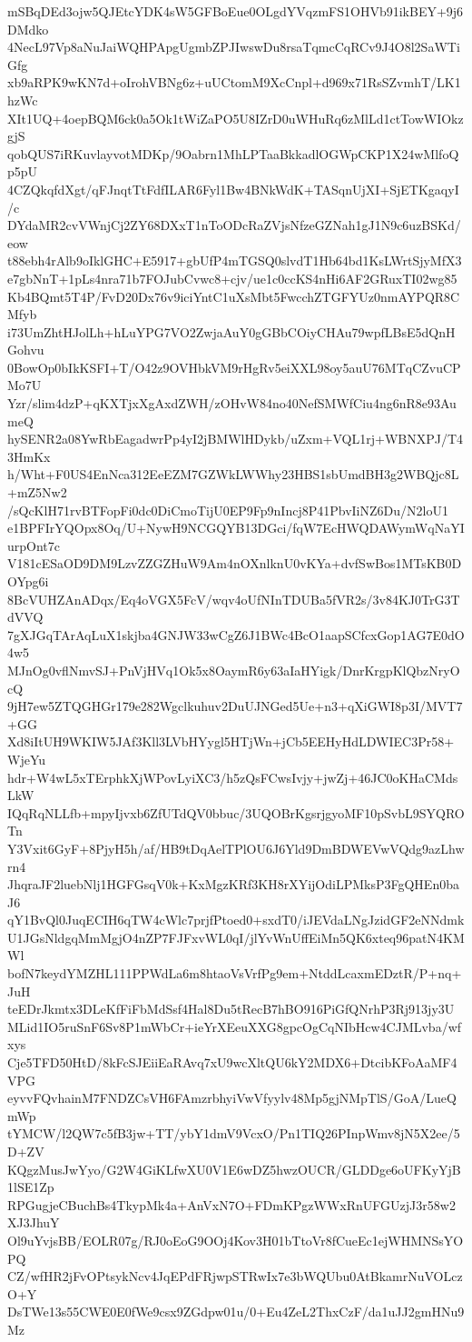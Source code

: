 mSBqDEd3ojw5QJEtcYDK4sW5GFBoEue0OLgdYVqzmFS1OHVb91ikBEY+9j6DMdko
4NecL97Vp8aNuJaiWQHPApgUgmbZPJIwswDu8rsaTqmcCqRCv9J4O8l2SaWTiGfg
xb9aRPK9wKN7d+oIrohVBNg6z+uUCtomM9XcCnpl+d969x71RsSZvmhT/LK1hzWc
XIt1UQ+4oepBQM6ck0a5Ok1tWiZaPO5U8IZrD0uWHuRq6zMlLd1ctTowWIOkzgjS
qobQUS7iRKuvlayvotMDKp/9Oabrn1MhLPTaaBkkadlOGWpCKP1X24wMlfoQp5pU
4CZQkqfdXgt/qFJnqtTtFdfILAR6Fyl1Bw4BNkWdK+TASqnUjXI+SjETKgaqyI/c
DYdaMR2cvVWnjCj2ZY68DXxT1nToODcRaZVjsNfzeGZNah1gJ1N9c6uzBSKd/eow
t88ebh4rAlb9oIklGHC+E5917+gbUfP4mTGSQ0slvdT1Hb64bd1KsLWrtSjyMfX3
e7gbNnT+1pLs4nra71b7FOJubCvwc8+cjv/ue1c0ccKS4nHi6AF2GRuxTI02wg85
Kb4BQmt5T4P/FvD20Dx76v9iciYntC1uXsMbt5FwcchZTGFYUz0nmAYPQR8CMfyb
i73UmZhtHJolLh+hLuYPG7VO2ZwjaAuY0gGBbCOiyCHAu79wpfLBsE5dQnHGohvu
0BowOp0bIkKSFI+T/O42z9OVHbkVM9rHgRv5eiXXL98oy5auU76MTqCZvuCPMo7U
Yzr/slim4dzP+qKXTjxXgAxdZWH/zOHvW84no40NefSMWfCiu4ng6nR8e93AumeQ
hySENR2a08YwRbEagadwrPp4yI2jBMWlHDykb/uZxm+VQL1rj+WBNXPJ/T43HmKx
h/Wht+F0US4EnNca312EeEZM7GZWkLWWhy23HBS1sbUmdBH3g2WBQjc8L+mZ5Nw2
/sQcKlH71rvBTFopFi0dc0DiCmoTijU0EP9Fp9nIncj8P41PbvIiNZ6Du/N2loU1
e1BPFIrYQOpx8Oq/U+NywH9NCGQYB13DGci/fqW7EcHWQDAWymWqNaYIurpOnt7c
V181cESaOD9DM9LzvZZGZHuW9Am4nOXnlknU0vKYa+dvfSwBos1MTsKB0DOYpg6i
8BcVUHZAnADqx/Eq4oVGX5FcV/wqv4oUfNInTDUBa5fVR2s/3v84KJ0TrG3TdVVQ
7gXJGqTArAqLuX1skjba4GNJW33wCgZ6J1BWc4BcO1aapSCfcxGop1AG7E0dO4w5
MJnOg0vflNmvSJ+PnVjHVq1Ok5x8OaymR6y63aIaHYigk/DnrKrgpKlQbzNryOcQ
9jH7ew5ZTQGHGr179e282Wgclkuhuv2DuUJNGed5Ue+n3+qXiGWI8p3I/MVT7+GG
Xd8iItUH9WKIW5JAf3Kll3LVbHYygl5HTjWn+jCb5EEHyHdLDWIEC3Pr58+WjeYu
hdr+W4wL5xTErphkXjWPovLyiXC3/h5zQsFCwsIvjy+jwZj+46JC0oKHaCMdsLkW
IQqRqNLLfb+mpyIjvxb6ZfUTdQV0bbuc/3UQOBrKgsrjgyoMF10pSvbL9SYQROTn
Y3Vxit6GyF+8PjyH5h/af/HB9tDqAelTPlOU6J6Yld9DmBDWEVwVQdg9azLhwrn4
JhqraJF2luebNlj1HGFGsqV0k+KxMgzKRf3KH8rXYijOdiLPMksP3FgQHEn0baJ6
qY1BvQl0JuqECIH6qTW4cWlc7prjfPtoed0+sxdT0/iJEVdaLNgJzidGF2eNNdmk
U1JGsNldgqMmMgjO4nZP7FJFxvWL0qI/jlYvWnUffEiMn5QK6xteq96patN4KMWl
bofN7keydYMZHL111PPWdLa6m8htaoVsVrfPg9em+NtddLcaxmEDztR/P+nq+JuH
teEDrJkmtx3DLeKfFiFbMdSsf4Hal8Du5tRecB7hBO916PiGfQNrhP3Rj913jy3U
MLid1IO5ruSnF6Sv8P1mWbCr+ieYrXEeuXXG8gpcOgCqNIbHcw4CJMLvba/wfxys
Cje5TFD50HtD/8kFcSJEiiEaRAvq7xU9wcXltQU6kY2MDX6+DtcibKFoAaMF4VPG
eyvvFQvhainM7FNDZCsVH6FAmzrbhyiVwVfyylv48Mp5gjNMpTlS/GoA/LueQmWp
tYMCW/l2QW7c5fB3jw+TT/ybY1dmV9VcxO/Pn1TIQ26PInpWmv8jN5X2ee/5D+ZV
KQgzMusJwYyo/G2W4GiKLfwXU0V1E6wDZ5hwzOUCR/GLDDge6oUFKyYjB1lSE1Zp
RPGugjeCBuchBs4TkypMk4a+AnVxN7O+FDmKPgzWWxRnUFGUzjJ3r58w2XJ3JhuY
Ol9uYvjsBB/EOLR07g/RJ0oEoG9OOj4Kov3H01bTtoVr8fCueEc1ejWHMNSsYOPQ
CZ/wfHR2jFvOPtsykNcv4JqEPdFRjwpSTRwIx7e3bWQUbu0AtBkamrNuVOLczO+Y
DsTWe13s55CWE0E0fWe9csx9ZGdpw01u/0+Eu4ZeL2ThxCzF/da1uJJ2gmHNu9Mz
